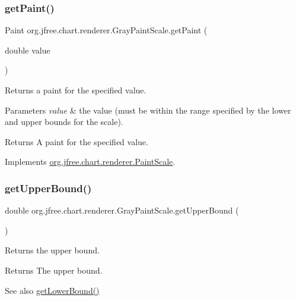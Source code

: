 \subsubsection{\texorpdfstring{get\+Paint()}{getPaint()}}
{\footnotesize\ttfamily Paint org.\+jfree.\+chart.\+renderer.\+Gray\+Paint\+Scale.\+get\+Paint (\begin{DoxyParamCaption}\item[{double}]{value }\end{DoxyParamCaption})}

Returns a paint for the specified value.


\begin{DoxyParams}{Parameters}
{\em value} & the value (must be within the range specified by the lower and upper bounds for the scale).\\
\hline
\end{DoxyParams}
\begin{DoxyReturn}{Returns}
A paint for the specified value. 
\end{DoxyReturn}


Implements \mbox{\hyperlink{interfaceorg_1_1jfree_1_1chart_1_1renderer_1_1_paint_scale_a32b81d8ac78e030422937dc97526661d}{org.\+jfree.\+chart.\+renderer.\+Paint\+Scale}}.

\mbox{\label{classorg_1_1jfree_1_1chart_1_1renderer_1_1_gray_paint_scale_a5420a928eca3df6dc07e2400ff89cab9}} 
\subsubsection{\texorpdfstring{get\+Upper\+Bound()}{getUpperBound()}}
{\footnotesize\ttfamily double org.\+jfree.\+chart.\+renderer.\+Gray\+Paint\+Scale.\+get\+Upper\+Bound (\begin{DoxyParamCaption}{ }\end{DoxyParamCaption})}

Returns the upper bound.

\begin{DoxyReturn}{Returns}
The upper bound.
\end{DoxyReturn}
\begin{DoxySeeAlso}{See also}
\mbox{\hyperlink{classorg_1_1jfree_1_1chart_1_1renderer_1_1_gray_paint_scale_aa66a8fc46c5cf10fd357d677e93ec48f}{get\+Lower\+Bound()}} 
\end{DoxySeeAlso}


